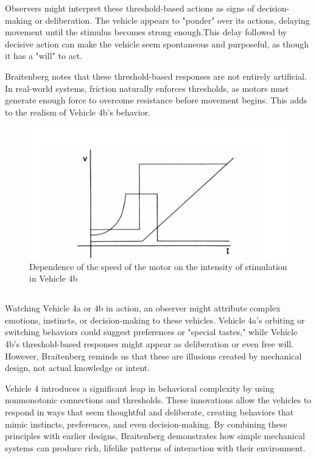 \documentclass{article}
\begin{document}
	Observers might interpret these threshold-based actions as signs of decision-making or deliberation. The vehicle appears to "ponder" over its actions, delaying movement until the stimulus becomes strong enough.This delay followed by decisive action can make the vehicle seem spontaneous and purposeful, as though it has a "will" to act.

	Braitenberg notes that these threshold-based responses are not entirely artificial. In real-world systems, friction naturally enforces thresholds, as motors must generate enough force to overcome resistance before movement begins. This adds to the realism of Vehicle 4b's behavior.

	\begin{figure}[h]
		\centering
		\includegraphics[scale=1]{images/figure_8.png}
		\caption{Dependence of the speed of the motor on the intensity of stimulation in Vehicle 4b}
		\label{fig:vehicle-4b}
	\end{figure}

	\subsection*{}

	Watching Vehicle 4a or 4b in action, an observer might attribute complex emotions, instincts, or decision-making to these vehicles. Vehicle 4a's orbiting or switching behaviors could suggest preferences or "special tastes," while Vehicle 4b's threshold-based responses might appear as deliberation or even free will. However, Braitenberg reminds us that these are illusions created by mechanical design, not actual knowledge or intent.


	Vehicle 4 introduces a significant leap in behavioral complexity by using nonmonotonic connections and thresholds. These innovations allow the vehicles to respond in ways that seem thoughtful and deliberate, creating behaviors that mimic instincts, preferences, and even decision-making. By combining these principles with earlier designs, Braitenberg demonstrates how simple mechanical systems can produce rich, lifelike patterns of interaction with their environment.
\end{document}
